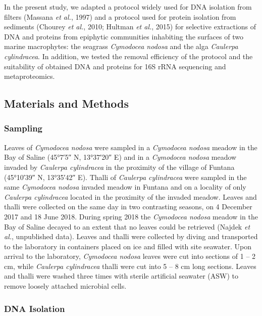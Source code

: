 \documentclass[12pt,]{article}
\begin{document}
In the present study, we adapted a protocol widely used for DNA
isolation from filters (Massana \emph{et al.}, 1997) and a protocol used
for protein isolation from sediments (Chourey \emph{et al.}, 2010;
Hultman \emph{et al.}, 2015) for selective extractions of DNA and
proteins from epiphytic communities inhabiting the surfaces of two
marine macrophytes: the seagrass \emph{Cymodocea nodosa} and the alga
\emph{Caulerpa cylindracea}. In addition, we tested the removal
efficiency of the protocol and the suitability of obtained DNA and
proteins for 16S rRNA sequencing and metaproteomics.

\newpage

\subsection{Materials and Methods}\label{materials-and-methods}

\subsubsection{Sampling}\label{sampling}

Leaves of \emph{Cymodocea nodosa} were sampled in a \emph{Cymodocea
nodosa} meadow in the Bay of Saline (\ang{45;7;5} N, \ang{13;37;20} E)
and in a \emph{Cymodocea nodosa} meadow invaded by \emph{Caulerpa
cylindracea} in the proximity of the village of Funtana (\ang{45;10;39}
N, \ang{13;35;42} E). Thalli of \emph{Caulerpa cylindracea} were sampled
in the same \emph{Cymodocea nodosa} invaded meadow in Funtana and on a
locality of only \emph{Caulerpa cylindracea} located in the proximity of
the invaded meadow. Leaves and thalli were collected on the same day in
two contrasting seasons, on 4 December 2017 and 18 June 2018. During
spring 2018 the \emph{Cymodocea nodosa} meadow in the Bay of Saline
decayed to an extent that no leaves could be retrieved (Najdek \emph{et
al.}, unpublished data). Leaves and thalli were collected by diving and
transported to the laboratory in containers placed on ice and filled
with site seawater. Upon arrival to the laboratory, \emph{Cymodocea
nodosa} leaves were cut into sections of 1 -- 2 \si{\cm}, while
\emph{Caulerpa cylindracea} thalli were cut into 5 -- 8 \si{\cm} long
sections. Leaves and thalli were washed three times with sterile
artificial seawater (ASW) to remove loosely attached microbial cells.

\subsubsection{DNA Isolation}\label{dna-isolation}
\end{document}
